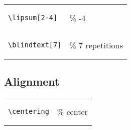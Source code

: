 \begin{tabular}{l l}

\begin{lstlisting}
\lipsum[2-4]
\end{lstlisting} 
& \% \textparagraph 2-4 \\

\begin{lstlisting}
\blindtext[7]
\end{lstlisting} 
& \% 7 repetitions \\

\end{tabular}

\subsection*{Alignment}

\begin{tabular}{l l}

\begin{lstlisting}
\centering
\end{lstlisting} 
& \% center  \\

\end{tabular}

\ \\